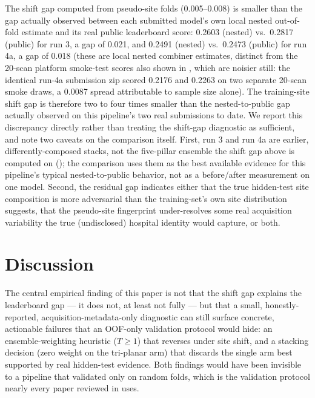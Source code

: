 \documentclass[10pt]{article}
\begin{document}
The shift gap computed from pseudo-site folds (0.005--0.008) is smaller than the gap actually observed between each submitted model's own local nested out-of-fold estimate and its real public leaderboard score: 0.2603 (nested) vs.\ 0.2817 (public) for run 3, a gap of 0.021, and 0.2491 (nested) vs.\ 0.2473 (public) for run 4a, a gap of 0.018 (these are local nested combiner estimates, distinct from the 20-scan platform smoke-test scores also shown in , which are noisier still: the identical run-4a submission zip scored 0.2176 and 0.2263 on two separate 20-scan smoke draws, a 0.0087 spread attributable to sample size alone). The training-site shift gap is therefore two to four times smaller than the nested-to-public gap actually observed on this pipeline's two real submissions to date. We report this discrepancy directly rather than treating the shift-gap diagnostic as sufficient, and note two caveats on the comparison itself. First, run 3 and run 4a are earlier, differently-composed stacks, not the five-pillar ensemble the shift gap above is computed on (); the comparison uses them as the best available evidence for this pipeline's typical nested-to-public behavior, not as a before/after measurement on one model. Second, the residual gap indicates either that the true hidden-test site composition is more adversarial than the training-set's own site distribution suggests, that the pseudo-site fingerprint under-resolves some real acquisition variability the true (undisclosed) hospital identity would capture, or both.

\section{Discussion}
\label{sec:discussion}

The central empirical finding of this paper is not that the shift gap explains the leaderboard gap --- it does not, at least not fully --- but that a small, honestly-reported, acquisition-metadata-only diagnostic can still surface concrete, actionable failures that an OOF-only validation protocol would hide: an ensemble-weighting heuristic ($T \geq 1$) that reverses under site shift, and a stacking decision (zero weight on the tri-planar arm) that discards the single arm best supported by real hidden-test evidence. Both findings would have been invisible to a pipeline that validated only on random folds, which is the validation protocol nearly every paper reviewed in  uses.
\end{document}
